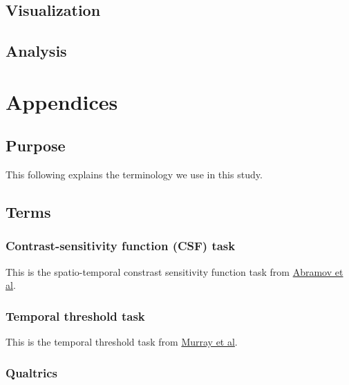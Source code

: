 \documentclass[]{article}
\begin{document}
\hypertarget{visualization}{%
\subsection{Visualization}\label{visualization}}

\hypertarget{analysis}{%
\subsection{Analysis}\label{analysis}}

\hypertarget{appendices}{%
\section{Appendices}\label{appendices}}

\hypertarget{purpose-1}{%
\subsection{Purpose}\label{purpose-1}}

This following explains the terminology we use in this study.

\hypertarget{terms}{%
\subsection{Terms}\label{terms}}

\hypertarget{contrast-sensitivity-function-csf-task}{%
\subsubsection{Contrast-sensitivity function (CSF)
task}\label{contrast-sensitivity-function-csf-task}}

This is the spatio-temporal constrast sensitivity function task from
\href{https://doi.org/10.1186/2042-6410-3-20}{Abramov et al}.

\hypertarget{temporal-threshold-task}{%
\subsubsection{Temporal threshold task}\label{temporal-threshold-task}}

This is the temporal threshold task from
\href{https://doi.org/10.1016/j.cub.2018.06.014}{Murray et al}.

\hypertarget{qualtrics}{%
\subsubsection{Qualtrics}\label{qualtrics}}
\end{document}
